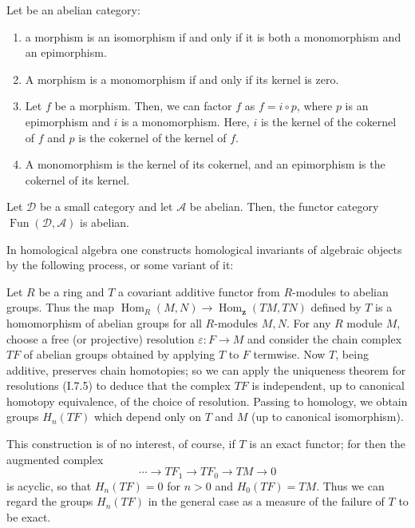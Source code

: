 \begin{theo} Let \ca be an abelian category:
\begin{enumerate}
    \item a morphism is an isomorphism if and only if it is both a monomorphism and an epimorphism.
    \item A morphism is a monomorphism if and only if its kernel is zero.
    \item Let $f$ be a morphism. Then, we can factor $f$ as $f=i \circ p$, where $p$ is an epimorphism and $i$ is a monomorphism. Here, $i$ is the kernel of the cokernel of $f$ and $p$ is the cokernel of the kernel of $f$.
    \item A monomorphism is the kernel of its cokernel, and an epimorphism is the cokernel of its kernel.
\end{enumerate}   
\end{theo}

\begin{prop}
Let $\mathcal{D}$ be a small category and let $\mathcal{A}$ be abelian. Then, the functor category $\operatorname{Fun}(\mathcal{D}, \mathcal{A})$ is abelian.   
\end{prop}

In homological algebra one constructs homological invariants of algebraic objects by the following process, or some variant of it:

Let $R$ be a ring and $T$ a covariant additive functor from $R$-modules to abelian groups. Thus the map $\operatorname{Hom}_R(M, N) \rightarrow \operatorname{Hom}_{\mathbf{z}}(T M, T N)$ defined by $T$ is a homomorphism of abelian groups for all $R$-modules $M, N$. For any $R$ module $M$, choose a free (or projective) resolution $\varepsilon: F \rightarrow M$ and consider the chain complex $T F$ of abelian groups obtained by applying $T$ to $F$ termwise. Now $T$, being additive, preserves chain homotopies; so we can apply the uniqueness theorem for resolutions (I.7.5) to deduce that the complex $T F$ is independent, up to canonical homotopy equivalence, of the choice of resolution. Passing to homology, we obtain groups $H_n(T F)$ which depend only on $T$ and $M$ (up to canonical isomorphism).

This construction is of no interest, of course, if $T$ is an exact functor; for then the augmented complex
$$
\cdots \rightarrow T F_1 \rightarrow T F_0 \rightarrow T M \rightarrow 0
$$
is acyclic, so that $H_n(T F)=0$ for $n>0$ and $H_0(T F)=T M$. Thus we can regard the groups $H_n(T F)$ in the general case as a measure of the failure of $T$ to be exact.

